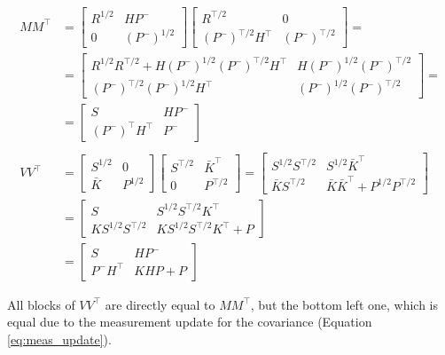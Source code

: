 \documentclass{article}
\begin{document}
\begin{equation}
\begin{split}
    MM^\top &= \begin{bmatrix} R^{1/2} & HP^- \\ 0 & (P^-)^{1/2} \end{bmatrix}\begin{bmatrix} R^{\top/2} & 0 \\ (P^-)^{\top/2}H^\top & (P^-)^{\top/2} \end{bmatrix}= \\
    &=\begin{bmatrix} R^{1/2}R^{\top/2} + H(P^-)^{1/2}(P^-)^{\top/2}H^\top & H(P^-)^{1/2}(P^-)^{\top/2} \\ (P^-)^{\top/2}(P^-)^{1/2}H^\top & (P^-)^{1/2}(P^-)^{\top/2} \end{bmatrix} = \\
    &=\begin{bmatrix}S & HP^- \\ (P^-)^\top H^\top & P^- \end{bmatrix} \\
    \\
    VV^\top & = \begin{bmatrix} S^{1/2} & 0 \\ \bar{K} & P^{1/2} \end{bmatrix}\begin{bmatrix} S^{\top/2} & \bar{K}^\top \\ 0 & P^{\top/2} \end{bmatrix} = \begin{bmatrix} S^{1/2}S^{\top/2} & S^{1/2}\bar{K}^\top \\ \bar{K}S^{\top/2} & \bar{K}\bar{K}^\top + P^{1/2}P^{\top/2} \end{bmatrix}\\
     & = \begin{bmatrix} S & S^{1/2}S^{\top/2}K^\top \\ KS^{1/2}S^{\top/2} & KS^{1/2}S^{\top/2}K^\top + P\end{bmatrix} \\
     & = \begin{bmatrix} S & HP^- \\ P^-H^\top & KHP + P\end{bmatrix}
\end{split}\label{eq:deriv_meas_update_sr}
\end{equation}

All blocks of $VV^\top$ are directly equal to $MM^\top$, but the bottom left one, which is equal due to the measurement update for the covariance (Equation \ref{eq:meas_update}).
\end{document}
